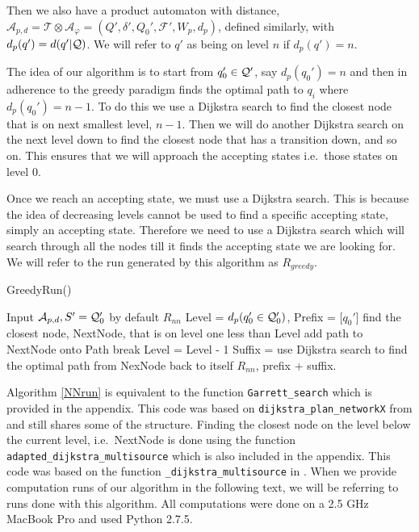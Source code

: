 Then we also have a product automaton with distance, $\mathcal{A}_{p,d} = \mathcal{T} \otimes \mathcal{A}_\varphi = (Q', \delta', Q_0', \mathcal{F}', W_p, d_p)$, defined similarly, with $d_p(q') = d(q'|\mathcal{Q})$. We will refer to $q'$ as being on level $n$ if $d_p(q') = n$.

The idea of our algorithm is to start from $q_0' \in \mathcal{Q}'$, say $d_p(q_0')=n$ and then in adherence to the greedy paradigm finds the optimal path to $q_i$ where $d_p(q_0')=n-1$. To do this we use a Dijkstra search to find the closest node that is on next smallest level, $n-1$. Then we will do another Dijkstra search on the next level down to find the closest node that has a transition down, and so on. This ensures that we will approach the accepting states i.e.\ those states on level 0. 

Once we reach an accepting state, we must use a Dijkstra search. This is because the idea of decreasing levels cannot be used to find a specific accepting state, simply an accepting state. Therefore we need to use a Dijkstra search which will search through all the nodes till it finds the accepting state we are looking for. We will refer to the run generated by this algorithm as $R_{greedy}$.
\begin{algorithm}
\caption{GreedyRun()}\label{NNrun}
\begin{algorithmic}[1]
\Require Input $\mathcal{A}_{p,d}, S' = \mathcal{Q}_0'$ by default
\Ensure $R_{nn}$
\State Level = $d_p(q_0' \in \mathcal{Q}_0')$, Prefix = [$q_0'$]
\State find the closest node, NextNode, that is on level one less than Level %
\State	add path to NextNode onto Path
\State break
\EndIf
\State Level = Level - 1	
\EndWhile
\State Suffix = use Dijkstra search to find the optimal path from NexNode back to itself %
\State $R_{nn}$, prefix + suffix.
\end{algorithmic}
\end{algorithm}

Algorithm \ref{NNrun} is equivalent to the function \texttt{Garrett\_search} which is provided in the appendix. This code was based on \texttt{dijkstra\_plan\_networkX} from \cite{pMasGit} and still shares some of the structure. Finding the closest node on the level below the current level, i.e.\ NextNode is done using the function \texttt{adapted\_dijkstra\_multisource} which is also included in the appendix. This code was based on the function  \texttt{\_dijkstra\_multisource} in \cite{schult08}. When we provide computation runs of our algorithm in the following text, we will be referring to runs done with this algorithm. All computations were done on a 2.5 GHz MacBook Pro and used Python 2.7.5.%

